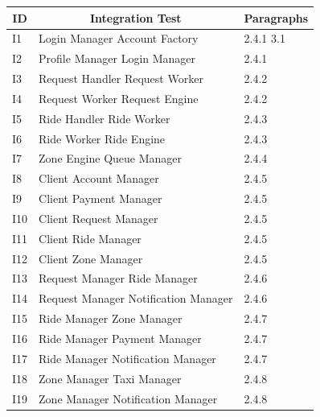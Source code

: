 \documentclass[a4paper,11pt]{report} %
\begin{document}
			\begin{center}
				\begin{tabular}{ l | p{7cm} | p{5cm} }\hline
					\multicolumn{1}{c|}{\textbf{ID}} & \multicolumn{1}{|c|}{\textbf{Integration Test}} & \textbf{Paragraphs}\\\hline
					 I1 & Login Manager \textrightarrow Account Factory & 2.4.1 \hspace{20pt} 3.1\\\hline
					 I2 & Profile Manager \textrightarrow Login Manager & 2.4.1\\\hline
					 I3 & Request Handler \textrightarrow Request Worker & 2.4.2\\\hline
					 I4 & Request Worker \textrightarrow Request Engine & 2.4.2\\\hline
					 I5 & Ride Handler \textrightarrow Ride Worker & 2.4.3\\\hline
					 I6 & Ride Worker \textrightarrow Ride Engine & 2.4.3\\\hline
					 I7 & Zone Engine \textrightarrow Queue Manager & 2.4.4\\\hline					 					 					 	
					 I8 & Client \textrightarrow Account Manager & 2.4.5\\\hline		
					 I9 & Client \textrightarrow Payment Manager & 2.4.5\\\hline					 					 					 	
					 I10 & Client \textrightarrow Request Manager & 2.4.5\\\hline					 					 				
					 I11 & Client \textrightarrow Ride Manager & 2.4.5\\\hline					 					 					 	
					 I12 & Client \textrightarrow Zone Manager & 2.4.5\\\hline					 					 					 	
					 I13 & Request Manager \textrightarrow Ride Manager & 2.4.6\\\hline		
					 I14 & Request Manager \textrightarrow Notification Manager & 2.4.6\\\hline					 					 					 					
					 I15 & Ride Manager \textrightarrow Zone Manager & 2.4.7\\\hline					 					 					 	
					 I16 & Ride Manager \textrightarrow Payment Manager & 2.4.7\\\hline					 	 			 				
					 I17 & Ride Manager \textrightarrow Notification Manager & 2.4.7 \\\hline					 					 					 		 					 	
					 I18 & Zone Manager \textrightarrow Taxi Manager & 2.4.8\\\hline					 					 					 	
					 I19 & Zone Manager \textrightarrow Notification Manager & 2.4.8 \\\hline					 					 					 	
					 					 					 					 					 	
					 					 			 					 					 	
				\end{tabular}
			\end{center}			
\end{document}
